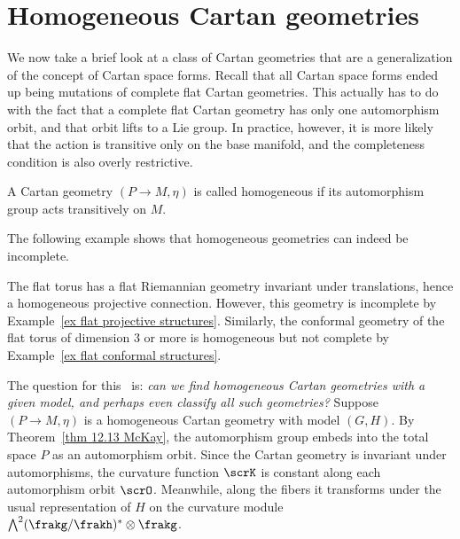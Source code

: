 

\section{Homogeneous Cartan geometries}

We now take a brief look at a class of Cartan geometries that are a generalization of the concept of Cartan space forms. Recall that all Cartan space forms ended up being mutations of complete flat Cartan geometries. This actually has to do with the fact that a complete flat Cartan geometry has only one automorphism orbit, and that orbit lifts to a Lie group. In practice, however, it is more likely that the action is transitive only on the base manifold, and the completeness condition is also overly restrictive.


\begin{defn}
    A Cartan geometry $(P\to M,\eta)$ is called homogeneous if its automorphism group acts transitively on $M$.
\end{defn}

The following example shows that homogeneous geometries can indeed be incomplete.

\begin{example}
    The flat torus has a flat Riemannian geometry invariant under translations, hence a homogeneous projective connection. However, this geometry is incomplete by Example~\ref{ex flat projective structures}. Similarly, the conformal geometry of the flat torus of dimension $3$ or more is homogeneous but not complete by Example~\ref{ex flat conformal structures}.
\end{example}

The question for this \sect\ is: \emph{can we find homogeneous Cartan geometries with a given model, and perhaps even classify all such geometries?} Suppose $(P\to M,\eta)$ is a homogeneous Cartan geometry with model $(G,H)$. By Theorem~\ref{thm 12.13 McKay}, the automorphism group embeds into the total space $P$ as an automorphism orbit. Since the Cartan geometry is invariant under automorphisms, the curvature function $\scrK$ is constant along each automorphism orbit $\scrO$. Meanwhile, along the fibers it transforms under the usual representation of $H$ on the curvature module $\bigwedge^2(\frakg\slash\frakh)^\ast\otimes\frakg$. 

